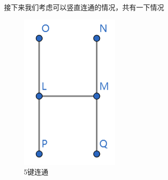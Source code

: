 \documentclass{article}
\begin{document}
接下来我们考虑可以竖直连通的情况，共有一下情况
	\begin{figure}[!h]
	
	\centering
	\includegraphics[scale=0.5]{bond_5}
	\caption{\heiti{}5键连通}
	\label{fig:2}
\end{figure}
	
\end{document}

